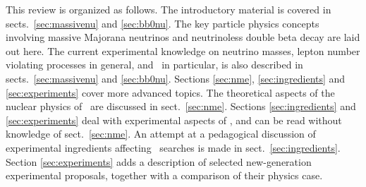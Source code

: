 This review is organized as follows. The introductory material is covered in sects.~\ref{sec:massivenu} and \ref{sec:bb0nu}. The key particle physics concepts involving massive Majorana neutrinos and neutrinoless double beta decay are laid out here. The current experimental knowledge on neutrino masses, lepton number violating processes in general, and \bbonu\ in particular, is also described in sects.~\ref{sec:massivenu} and \ref{sec:bb0nu}. Sections \ref{sec:nme}, \ref{sec:ingredients} and \ref{sec:experiments} cover more advanced topics. The theoretical aspects of the nuclear physics of \bbonu\ are discussed in sect.~\ref{sec:nme}. Sections \ref{sec:ingredients} and \ref{sec:experiments} deal with experimental aspects of \bbonu, and can be read without knowledge of sect.~\ref{sec:nme}. An attempt at a pedagogical discussion of experimental ingredients affecting \bbonu\ searches is made in sect.~\ref{sec:ingredients}. Section \ref{sec:experiments} adds a description of selected new-generation experimental proposals, together with a comparison of their physics case. 

